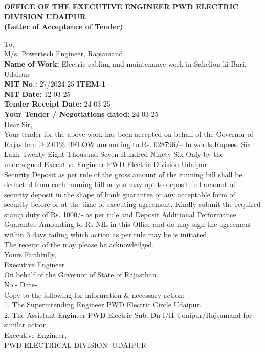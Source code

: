 \documentclass[a4paper]{article}
\begin{document}
\begin{center}
    \textbf{OFFICE OF THE EXECUTIVE ENGINEER PWD ELECTRIC DIVISION UDAIPUR} \\
    \vspace{0.5cm}
    \textbf{(Letter of Acceptance of Tender)}
\end{center}

To, \\
M/s. Powertech Engineer, Rajsamand \\

\vspace{0.5cm}
\textbf{Name of Work:} Electric cabling and maintenance work in Sahelion ki Bari, Udaipur \\
\textbf{NIT No.:} 27/2024-25 \quad \textbf{ITEM-1} \\
\textbf{NIT Date:} 12-03-25 \\
\textbf{Tender Receipt Date:} 24-03-25 \\
\textbf{Your Tender / Negotiations dated:} 24-03-25 \\

Dear Sir, \\

Your tender for the above work has been accepted on behalf of the Governor of Rajasthan @ 2.01\% BELOW amounting to Rs. 628796/-- In words Rupees. Six Lakh Twenty Eight Thousand Seven Hundred Ninety Six Only by the undersigned Executive Engineer PWD Electric Division Udaipur. \\

Security Deposit as per rule of the gross amount of the running bill shall be deducted from each running bill or you may opt to deposit full amount of security deposit in the shape of bank guarantee or any acceptable form of security before or at the time of executing agreement. Kindly submit the required stamp duty of Rs. 1000/- as per rule and Deposit Additional Performance Guarantee Amounting to Rs NIL in this Office and do may sign the agreement within 3 days failing which action as per rule may be is initiated. \\
The receipt of the may please be acknowledged. \\

Yours Faithfully, \\
\vspace{0.5cm}
Executive Engineer \\
On behalf of the Governor of State of Rajasthan \\

No.- \hfill Date- \\
Copy to the following for information \& necessary action: - \\
1. The Superintending Engineer PWD Electric Circle Udaipur. \\
2. The Assistant Engineer PWD Electric Sub. Dn I/II Udaipur/Rajsamand for similar action. \\

Executive Engineer, \\
PWD ELECTRICAL DIVISION- UDAIPUR
\end{document}
